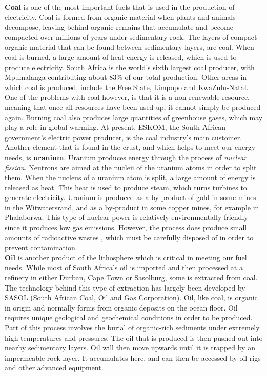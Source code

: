 \textbf{Coal} is one of the most important fuels that is used in the production of electricity. Coal is formed from organic material when plants and animals decompose, leaving behind organic remains that accumulate and become compacted over millions of years under sedimentary rock. The layers of compact organic material that can be found between sedimentary layers, are coal. When coal is burned, a large amount of heat energy is released, which is used to produce electricity. South Africa is the world's sixth largest coal producer, with Mpumalanga contributing about 83\% of our total production. Other areas in which coal is produced, include the Free State, Limpopo and KwaZulu-Natal. One of the problems with coal however, is that it is a non-renewable resource, meaning that once all resources have been used up, it cannot simply be produced again. Burning coal also produces large quantities of greenhouse gases, which may play a role in global warming. At present, ESKOM, the South African government's electric power producer, is the coal industry's main customer.\\

Another element that is found in the crust, and which helps to meet our energy needs, is \textbf{uranium}. Uranium produces energy through the process of \textit{nuclear fission}. Neutrons are aimed at the nucleii of the uranium atoms in order to split them. When the nucleus of a uranium atom is split, a large amount of energy is released as heat. This heat is used to produce steam, which turns turbines to generate electricity. Uranium is produced as a by-product of gold in some mines in the Witwatersrand, and as a by-product in some copper mines, for example in Phalaborwa. This type of nuclear power is relatively environmentally friendly since it produces low gas emissions. However, the process does produce small amounts of radioactive wastes , which must be carefully disposed of in order to prevent contamination.\\

\textbf{Oil} is another product of the lithosphere which is critical in meeting our fuel needs. While most of South Africa's oil is imported and then processed at a refinery in either Durban, Cape Town or Sasolburg, some is extracted from coal. The technology behind this type of extraction has largely been developed by SASOL (South African Coal, Oil and Gas Corporation). Oil, like coal, is organic in origin and normally forms from organic deposits on the ocean floor. Oil requires unique geological and geochemical conditions in order to be produced. Part of this process involves the burial of organic-rich sediments under extremely high temperatures and pressures. The oil that is produced is then pushed out into nearby sedimentary layers. Oil will then move upwards until it is trapped by an impermeable rock layer. It accumulates here, and can then be accessed by oil rigs and other advanced equipment.



